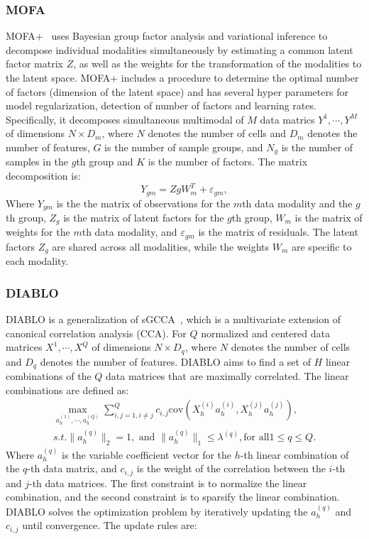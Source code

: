 \subsubsection{MOFA}
MOFA+~\cite{argelaguet2020mofa+} uses Bayesian group factor analysis and variational inference to decompose individual modalities simultaneously by estimating a common latent factor matrix $Z$, as well as the weights for the transformation of the modalities to the latent space. MOFA+ includes a procedure to determine the optimal number of factors (dimension of the latent space) and has several hyper parameters for model regularization, detection of number of factors and learning rates. Specifically, it decomposes simultaneous multimodal of $M$ data matrics $Y^1, \cdots, Y^M$ of dimensions $N\times D_m$, where $N$ denotes the number of cells and $D_m$ denotes the number of features, $G$ is the number of sample groups, and $N_g$ is the number of samples in the $g$th group and $K$ is the number of factors. The matrix decomposition is:
\begin{equation}
Y_{gm} = ZgW_m^{T} + \varepsilon_{gm}, 
\end{equation}
Where $Y_{gm}$ is the the matrix of observations for the $m$th data modality and the $g$th group, $Z_g$ is the matrix of latent factors for the $g$th group, $W_m$ is the matrix of weights for the $m$th data modality, and $\varepsilon_{gm}$ is the matrix of residuals. The latent factors $Z_g$ are shared across all modalities, while the weights $W_m$ are specific to each modality. %


\subsubsection{DIABLO}
DIABLO is a generalization of sGCCA~\citep{tenenhaus2014variable}, which is a multivariate extension of canonical correlation analysis (CCA). For $Q$ normalized and centered data matrices $X^1, \cdots, X^Q$ of dimensions $N\times D_q$, where $N$ denotes the number of cells and $D_q$ denotes the number of features. DIABLO aims to find a set of $H$ linear combinations of the $Q$ data matrices that are maximally correlated. The linear combinations are defined as:
\begin{equation}
\begin{aligned}
	\underset{a_h^{(1)},\cdots,a_h^{(Q)}}{\max} \sum_{i,j=1, i\neq j}^Q c_{i,j} \text{cov}(X_h^{(i)} a_h^{(i)}, X_h^{(j)} a_h^{(j)}),\\
	s.t. \|a_h^{(q)}\|_2 = 1, \text{ and } \|a_h^{(q)}\|_1 \leq \lambda^{(q)}, \text{for all} 1\leq q \leq Q.
\end{aligned}
\end{equation}
Where $a_h^{(q)}$ is the variable coefficient vector for the $h$-th linear combination of the $q$-th data matrix, and $c_{i,j}$ is the weight of the correlation between the $i$-th and $j$-th data matrices. The first constraint is to normalize the linear combination, and the second constraint is to sparsify the linear combination. DIABLO solves the optimization problem by iteratively updating the $a_h^{(q)}$ and $c_{i,j}$ until convergence. The update rules are:

